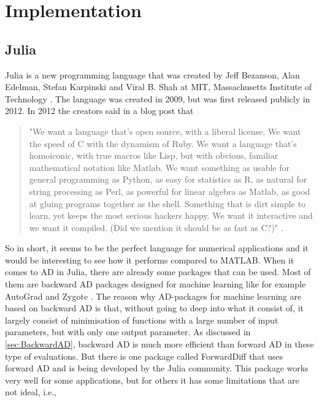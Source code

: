 \chapter{Implementation}
\label{ch:Implementation}
\section{Julia}
\label{sec:Julia}
Julia is a new programming language that was created by Jeff Bezanson, Alan Edelman, Stefan Karpinski and Viral B. Shah  at MIT, Massachusetts Institute of Technology \emph{\citep{juliaLab}}. The language was created in 2009, but was first released publicly in 2012. In 2012 the creators said in a blog post that
\begin{quotation}
"We want a language that’s open source, with a liberal license. We want the speed of C with the dynamism of Ruby. We want a language that’s homoiconic, with true macros like Lisp, but with obvious, familiar mathematical notation like Matlab. We want something as usable for general programming as Python, as easy for statistics as R, as natural for string processing as Perl, as powerful for linear algebra as Matlab, as good at gluing programs together as the shell. Something that is dirt simple to learn, yet keeps the most serious hackers happy. We want it interactive and we want it compiled. (Did we mention it should be as fast as C?)"\emph{\citep{juliaBlogRelease2012}} .
\end{quotation}
So in short, it seems to be the perfect language for numerical applications and it would be interesting to see how it performs compared to MATLAB. When it comes to AD in Julia, there are already some packages that can be used. Most of them are backward AD packages designed for machine learning like for example AutoGrad \emph{\citep{knet2016mlsys}} and Zygote \emph{\citep{innes2018don}}. The reason why AD-packages for machine learning are based on backward AD is that, without going to deep into what it consist of, it largely consist of minimisation of functions with a large number of input parameters, but with only one output parameter. As discussed in \autoref{sec:BackwardAD}, backward AD is much more efficient than forward AD in these type of evaluations. But there is one package called ForwardDiff \emph{\citep{ForwardDiff}} that uses forward AD and is being developed by the Julia community. This package works very well for some applications, but for others it has some limitations that are not ideal, i.e., 
